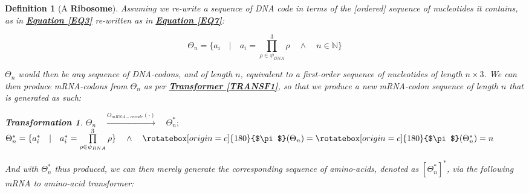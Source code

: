 \documentclass[a4paper, 18pt]{book} %
\newtheorem{defn}{Definition}
\newtheorem{trans}{Transformation}
\newcommand{\invpi}{\rotatebox[origin=c]{180}{$\pi$}}
\begin{document}
\vspace{2em}
\begin{defn}[A \textbf{Ribosome}]
\label{DEFRIBOSOME}
Assuming we re-write a sequence of DNA code in terms of the [ordered] sequence of nucleotides it contains, as in \textbf{\hyperref[EQ3]{Equation \ref{EQ3}}} re-written as in \textbf{\hyperref[EQ7]{Equation \ref{EQ7}}}:

\vspace{1em}
 \begin{equation}
\label{EQ7}
\Theta_n = \{a_i \quad | \quad a_i = \prod\limits_{\rho \in \psi_{DNA}}^3 \rho \quad \land \quad n \in \mathbb{N} \}
\end{equation}
\vspace{1em}

$\Theta_n$ would then be any sequence of DNA-codons, and of length $n$, equivalent to a first-order sequence of nucleotides of length $n \times 3$. We can then produce mRNA-codons from $\Theta_n$ as per \textbf{\hyperref[TRANSF1]{Transformer \ref{TRANSF1}}}, so that we produce a new mRNA-codon sequence of length $n$ that is generated as such:

\vspace{1em}
\begin{trans}
\label{TRANS1}
$\Theta_n \quad \xrightarrow{O_{mRNA-encode}(\cdot)} \quad \Theta^*_n;$\\
$\Theta^*_n = \{a_i^* \quad | \quad a_i^* = \prod\limits_{\rho \in \psi_{RNA}}^3 \rho \} \quad \land \quad \invpi(\Theta_n) = \invpi(\Theta^*_n) = n$
\end{trans}
\vspace{1em}

And with $\Theta^*_n$ thus produced, we can then merely generate the corresponding sequence of amino-acids, denoted as $[\Theta^*_n]^*$, via the following mRNA to amino-acid transformer: 


\end{defn}
\end{document}
